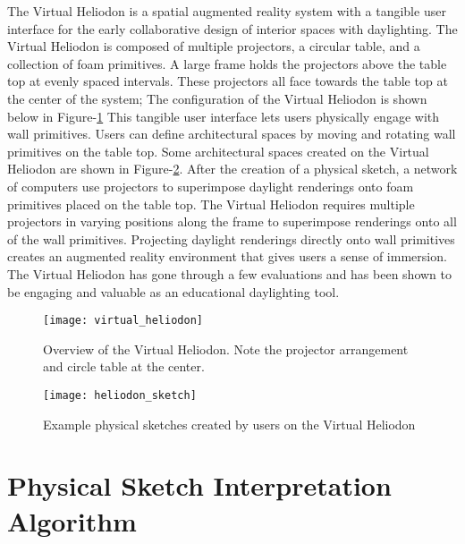 	The Virtual Heliodon is a spatial augmented reality system with a tangible user interface for the early collaborative design of interior spaces with daylighting\cite{sheng2009virtual, cutler2009inferring,nasman2013physical,nasman2013evaluation,cutler2010interpreting}. 
	The Virtual Heliodon is composed of multiple projectors, a circular table, and a collection of foam primitives.  
	A large frame holds the projectors above the table top at evenly spaced intervals. 
	These projectors all face towards the table top at the center of the system;
	The configuration of the Virtual Heliodon is shown below in Figure-\ref{fig:virtual_heliodon}
	This tangible user interface lets users physically engage with wall primitives. 
	Users can define architectural spaces by moving and rotating wall primitives on the table top.
	Some architectural spaces created on the Virtual Heliodon are shown in Figure-\ref{fig:heliodon_sketch}.
	After the creation of a physical sketch, a network of computers use projectors to superimpose daylight renderings onto foam primitives placed on the table top.
	The Virtual Heliodon requires multiple projectors in varying positions along the frame to superimpose renderings onto all of the wall primitives.
	Projecting daylight renderings directly onto wall primitives creates an augmented reality environment that gives users a sense of immersion\cite{nasman2013evaluation}.
	The Virtual Heliodon has gone through a few evaluations and has been shown to be engaging and valuable as an educational daylighting tool\cite{nasman2013evaluation}.

	\begin{figure}[h]
	\centering
	\texttt{[image: virtual\_heliodon]}
	\caption{Overview of the Virtual Heliodon. Note the projector arrangement and circle table at the center.}
	\label{fig:virtual_heliodon}
	\end{figure}

	\begin{figure}[h]
	\centering
	\texttt{[image: heliodon\_sketch]}
	\caption{Example physical sketches created by users on the Virtual Heliodon}
	\label{fig:heliodon_sketch}
	\end{figure}

\section{Physical Sketch Interpretation Algorithm}

